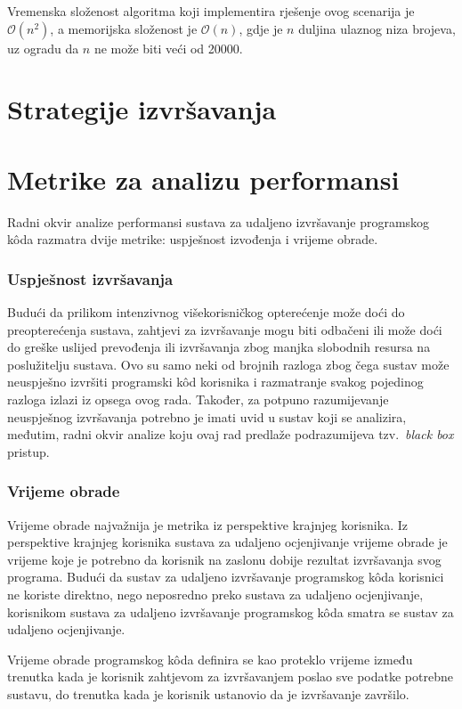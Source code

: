 \documentclass[times, utf8, diplomski]{fer}
\begin{document}
Vremenska složenost algoritma koji implementira rješenje ovog scenarija je $\mathcal{O}(n^2)$, a memorijska složenost je $\mathcal{O}(n)$, gdje je $n$ duljina ulaznog niza brojeva, uz ogradu da $n$ ne može biti veći od 20000.

\section{Strategije izvršavanja}

\section{Metrike za analizu performansi}
Radni okvir analize performansi sustava za udaljeno izvršavanje programskog kôda razmatra dvije metrike: uspješnost izvođenja i vrijeme obrade.

\subsubsection{Uspješnost izvršavanja}
Budući da prilikom intenzivnog višekorisničkog opterećenje može doći do preopterećenja sustava, zahtjevi za izvršavanje mogu biti odbačeni ili može doći do greške uslijed prevođenja ili izvršavanja zbog manjka slobodnih resursa na poslužitelju sustava. Ovo su samo neki od brojnih razloga zbog čega sustav može neuspješno izvršiti programski kôd korisnika i razmatranje svakog pojedinog razloga izlazi iz opsega ovog rada. Također, za potpuno razumijevanje neuspješnog izvršavanja potrebno je imati uvid u sustav koji se analizira, međutim, radni okvir analize koju ovaj rad predlaže podrazumijeva tzv.\ \textit{black box} pristup.

\subsubsection{Vrijeme obrade}
Vrijeme obrade  najvažnija je metrika iz perspektive krajnjeg korisnika. Iz perspektive krajnjeg korisnika sustava za udaljeno ocjenjivanje vrijeme obrade je vrijeme koje je potrebno da korisnik na zaslonu dobije rezultat izvršavanja svog programa. Budući da sustav za udaljeno izvršavanje programskog kôda korisnici ne koriste direktno, nego neposredno preko sustava za udaljeno ocjenjivanje, korisnikom sustava za udaljeno izvršavanje programskog kôda smatra se sustav za udaljeno ocjenjivanje.

Vrijeme obrade programskog kôda definira se kao proteklo vrijeme između trenutka kada je korisnik zahtjevom za izvršavanjem poslao sve podatke potrebne sustavu, do trenutka kada je korisnik ustanovio da je izvršavanje završilo.
\end{document}

